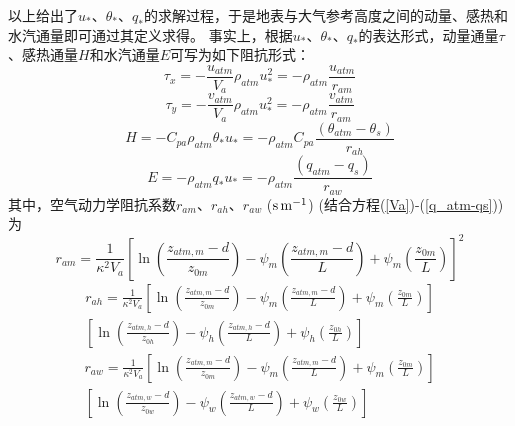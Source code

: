 以上给出了$u_\ast$、$\theta_\ast$、$q_\ast$的求解过程，于是地表与大气参考高度之间的动量、感热和水汽通量即可通过其定义求得。
事实上，根据$u_\ast$、$\theta_\ast$、$q_\ast$的表达形式，动量通量$\tau$、感热通量$H$和水汽通量$E$可写为如下阻抗形式：
\begin{equation}
\tau_{x}=-\frac{u_{atm}}{V_{a}} \rho_{atm} u_{*}^{2}=-\rho_{atm} \frac{u_{atm}}{r_{a m}}
\end{equation}
\begin{equation}
\tau_{y}=-\frac{v_{atm}}{V_{a}} \rho_{atm} u_{*}^{2}=-\rho_{atm} \frac{v_{atm}}{r_{a m}}
\end{equation}
\begin{equation}
H=-C_{p a} \rho_{atm} \theta_{*} u_{*}=-\rho_{atm} C_{p a} \frac{\left(\theta_{atm}-\theta_{s}\right)}{r_{a h}}
\end{equation}
\begin{equation}
E=-\rho_{atm} q_{*} u_{*}=-\rho_{atm} \frac{\left(q_{atm}-q_{s}\right)}{r_{a w}}
\end{equation}
其中，空气动力学阻抗系数$r_{am}$、$r_{ah}$、$r_{aw}$ ($\rm s\,m^{-1}$) (结合方程(\ref{Va})-(\ref{q_atm-qs}))为
\begin{equation}\label{ram}
r_{a m}=\frac{1}{\kappa^{2} V_{a}}\left[\ln \left(\frac{z_{atm, m}-d}{z_{0 m}}\right)-\psi_{m}\left(\frac{z_{atm, m}-d}{L}\right)+\psi_{m}\left(\frac{z_{0 m}}{L}\right)\right]^{2}
\end{equation}
\begin{equation}\label{rah}
\begin{array}{c}r_{a h}=\frac{1}{\kappa^{2} V_{a}}\left[\ln \left(\frac{z_{atm, m}-d}{z_{0 m}}\right)-\psi_{m}\left(\frac{z_{atm, m}-d}{L}\right)+\psi_{m}\left(\frac{z_{0 m}}{L}\right)\right] \\ {\left[\ln \left(\frac{z_{atm, h}-d}{z_{0 h}}\right)-\psi_{h}\left(\frac{z_{atm, h}-d}{L}\right)+\psi_{h}\left(\frac{z_{0 h}}{L}\right)\right]}\end{array}
\end{equation}
\begin{equation}\label{raw}
\begin{array}{c}r_{a w}=\frac{1}{\kappa^{2} V_{a}}\left[\ln \left(\frac{z_{atm, m}-d}{z_{0 m}}\right)-\psi_{m}\left(\frac{z_{atm, m}-d}{L}\right)+\psi_{m}\left(\frac{z_{0 m}}{L}\right)\right] \\ {\left[\ln \left(\frac{z_{atm, w}-d}{z_{0 w}}\right)-\psi_{w}\left(\frac{z_{atm, w}-d}{L}\right)+\psi_{w}\left(\frac{z_{0 w}}{L}\right)\right]}\end{array}
\end{equation}

